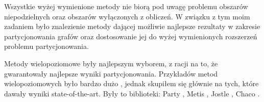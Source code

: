 Wszystkie wyżej wymienione metody nie biorą pod uwagę problemu obszarów niepodzielnych oraz obszarów wyłączonych z obliczeń.
W związku z tym moim zadaniem było znalezienie metody dającej możliwie najlepsze rezultaty w zakresie partycjonowania grafów oraz
dostosowanie jej do wyżej wymienionych rozszerzeń problemu partycjonowania.

Metody wielopoziomowe były najlepszym wyborem, z racji na to, że gwarantowały najlepsze wyniki partycjonowania.
Przykładów metod wielopoziomowych było bardzo dużo \cite{metis, jostle, Bui1993AHF, 103500, 185177, 279334, inproceedings, 129970, 10.1145/165939.165942},
jednak skupiłem się głównie na tych, które dawały wyniki state-of-the-art. Były to biblioteki:
Party \cite{1364754}, Metis \cite{metis}, Jostle \cite{jostle}, Chaco \cite{inproceedings}.

